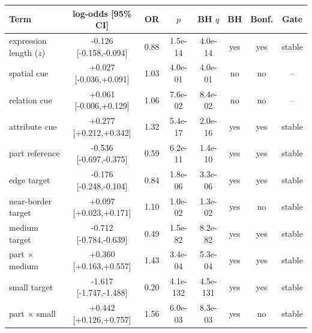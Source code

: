 \begin{tabular}{@{}lccccccc@{}}
\toprule
Term & log-odds [95\% CI] & OR & $p$ & BH $q$ & BH & Bonf. & Gate \\
\midrule
expression length ($z$) & -0.126 [-0.158,-0.094] & 0.88 & 1.5e-14 & 4.0e-14 & yes & yes & stable \\
spatial cue & +0.027 [-0.036,+0.091] & 1.03 & 4.0e-01 & 4.0e-01 & no & no & -- \\
relation cue & +0.061 [-0.006,+0.129] & 1.06 & 7.6e-02 & 8.4e-02 & no & no & -- \\
attribute cue & +0.277 [+0.212,+0.342] & 1.32 & 5.4e-17 & 2.0e-16 & yes & yes & stable \\
part reference & -0.536 [-0.697,-0.375] & 0.59 & 6.2e-11 & 1.4e-10 & yes & yes & stable \\
edge target & -0.176 [-0.248,-0.104] & 0.84 & 1.8e-06 & 3.3e-06 & yes & yes & stable \\
near-border target & +0.097 [+0.023,+0.171] & 1.10 & 1.0e-02 & 1.3e-02 & yes & no & stable \\
medium target & -0.712 [-0.784,-0.639] & 0.49 & 1.5e-82 & 8.2e-82 & yes & yes & stable \\
part $\times$ medium & +0.360 [+0.163,+0.557] & 1.43 & 3.4e-04 & 5.3e-04 & yes & yes & stable \\
small target & -1.617 [-1.747,-1.488] & 0.20 & 4.1e-132 & 4.5e-131 & yes & yes & stable \\
part $\times$ small & +0.442 [+0.126,+0.757] & 1.56 & 6.0e-03 & 8.3e-03 & yes & no & stable \\
\bottomrule
\end{tabular}
